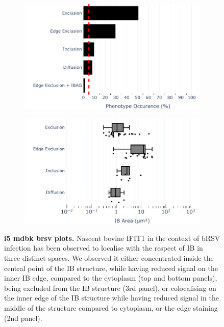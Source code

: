 \begin{figure}
    \begin{subfigure}{0.495\textwidth}
        \caption{}
        \includegraphics[width=1\linewidth]{09. Chapter 4/Figs/02. Infection/03. IFIT5/07. bar_i5_mdbk.pdf} 
    \end{subfigure}
    \begin{subfigure}{0.495\textwidth}
        \caption{}
        \includegraphics[width=1\linewidth]{09. Chapter 4/Figs/02. Infection/03. IFIT5/08. box_i5_mdbk.pdf}
    \end{subfigure}
    \caption[i5 mdbk brsv plots]{\textbf{i5 mdbk brsv plots.} Nascent bovine IFIT1 in the context of bRSV infection has been observed to localise with the respect of IB in three distinct spaces. We observed it either concentrated inside the central point of the IB structure, while having reduced signal on the inner IB edge, compared to the cytoplasm (top and bottom panels), being excluded from the IB structure (3rd panel), or colocalising on the inner edge of the IB structure while having reduced signal in the middle of the structure compared to cytoplasm, or the edge staining (2nd panel).}
    \label{fig:i5 mdbk brsv plots}
\end{figure}

